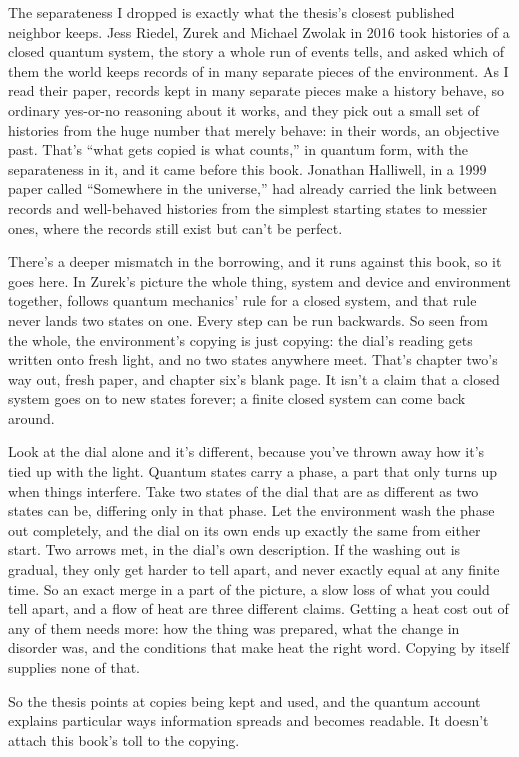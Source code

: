 \documentclass[11pt,twoside]{article}
\theoremstyle{thielethm}
\theoremstyle{thieledef}
\theoremstyle{thieledef}
\theoremstyle{thieledef}
\theoremstyle{thielethm}
\theoremstyle{thieleobs}
\theoremstyle{thielethm}
\begin{document}
The separateness I dropped is exactly what the thesis's closest published neighbor keeps. Jess Riedel, Zurek and Michael Zwolak in 2016 took histories of a closed quantum system, the story a whole run of events tells, and asked which of them the world keeps records of in many separate pieces of the environment. As I read their paper, records kept in many separate pieces make a history behave, so ordinary yes-or-no reasoning about it works, and they pick out a small set of histories from the huge number that merely behave: in their words, an objective past. That's ``what gets copied is what counts,'' in quantum form, with the separateness in it, and it came before this book. Jonathan Halliwell, in a 1999 paper called ``Somewhere in the universe,'' had already carried the link between records and well-behaved histories from the simplest starting states to messier ones, where the records still exist but can't be perfect.

There's a deeper mismatch in the borrowing, and it runs against this book, so it goes here. In Zurek's picture the whole thing, system and device and environment together, follows quantum mechanics' rule for a closed system, and that rule never lands two states on one. Every step can be run backwards. So seen from the whole, the environment's copying is just copying: the dial's reading gets written onto fresh light, and no two states anywhere meet. That's chapter two's way out, fresh paper, and chapter six's blank page. It isn't a claim that a closed system goes on to new states forever; a finite closed system can come back around.

Look at the dial alone and it's different, because you've thrown away how it's tied up with the light. Quantum states carry a phase, a part that only turns up when things interfere. Take two states of the dial that are as different as two states can be, differing only in that phase. Let the environment wash the phase out completely, and the dial on its own ends up exactly the same from either start. Two arrows met, in the dial's own description. If the washing out is gradual, they only get harder to tell apart, and never exactly equal at any finite time. So an exact merge in a part of the picture, a slow loss of what you could tell apart, and a flow of heat are three different claims. Getting a heat cost out of any of them needs more: how the thing was prepared, what the change in disorder was, and the conditions that make heat the right word. Copying by itself supplies none of that.

So the thesis points at copies being kept and used, and the quantum account explains particular ways information spreads and becomes readable. It doesn't attach this book's toll to the copying.
\end{document}
